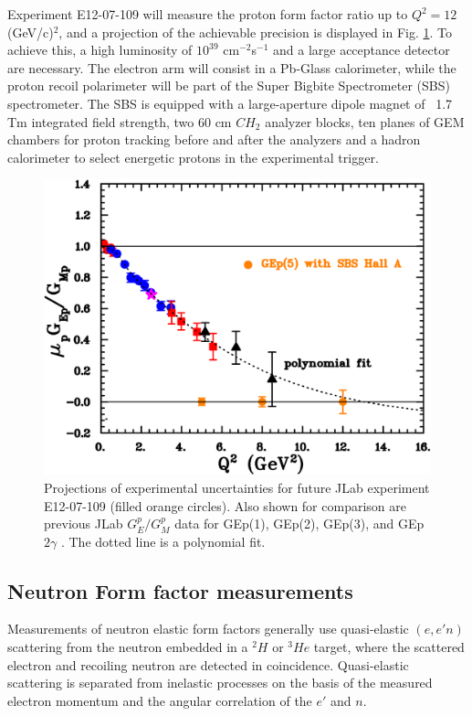 \documentclass[twocolumn,epjc3]{svjour3}
\begin{document}
Experiment E12-07-109 \cite{PR12-07-109} will measure the proton form factor ratio up to $Q^2 = 12$~ (GeV/c)$^2$, and a projection of the achievable precision is displayed in Fig. \ref{fig:Gep}. To achieve this, a high luminosity of $10^{39}$ cm$^{-2}$s$^{-1}$ and a large acceptance detector are necessary. The electron arm will consist in a Pb-Glass calorimeter, while the proton recoil polarimeter will be part of the Super Bigbite Spectrometer (SBS) spectrometer. The SBS is equipped with a large-aperture dipole magnet of ~1.7 Tm integrated field strength, two 60 cm $CH_2$ analyzer blocks, ten planes of GEM chambers for proton tracking before and after the analyzers and a hadron calorimeter to select energetic protons in the experimental trigger.

\begin{figure}
  \centering
  \includegraphics[width=1.00\columnwidth]{fig01_gepgmp.pdf}
  \caption{Projections of experimental uncertainties for future JLab experiment E12-07-109 \cite{PR12-07-109} (filled orange circles). Also shown for comparison are previous JLab $G^p_E/G^p_M$ data for GEp(1), GEp(2), GEp(3), and GEp$2\gamma$ \cite{Jones:1999rz,Punjabi:2005wq,Gayou:2001qd, Puckett:2011xg,Puckett:2010ac,Puckett:2017flj,Meziane:2010xc}. The dotted line is a polynomial fit.}
  \label{fig:Gep}
\end{figure}

\subsection{Neutron Form factor measurements}
Measurements of neutron elastic form factors generally use quasi-elastic $(e,e'n)$ scattering from the neutron embedded in a $^2\!H$ or $^3\!He $ target, where the scattered electron and recoiling neutron are detected in coincidence. Quasi-elastic scattering is separated from inelastic processes on the basis of the measured electron momentum and the angular correlation of the $e'$ and $n$.
\end{document}

